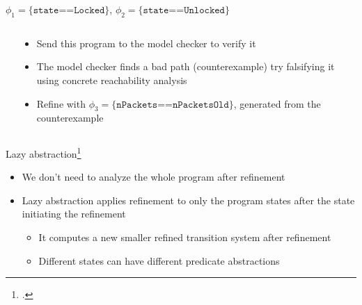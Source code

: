 \documentclass[aspectratio=169,notes]{beamer}
\begin{document}
\begin{frame}{}
  \begingroup\footnotesize\vspace{-0.7em}
  $\phi_1 = \texttt{\{state==Locked\}}$, $\phi_2 = \texttt{\{state==Unlocked\}}$\vspace{-1.7em}
  \begin{columns}[t]
    \begin{column}{0.50\textwidth}
      
    \end{column}\pause
    \begin{column}{0.50\textwidth}
      \begin{center}

        \begin{itemize}\footnotesize
        \item<5-> Send this program to the model checker to verify it
        \item<6-> The model checker finds a bad path (counterexample) try falsifying it using concrete reachability analysis%
        \item<7-> Refine with $\phi_3 = \texttt{\{nPackets==nPacketsOld\}}$, generated from the counterexample
        \end{itemize}
      \end{center}

    \end{column}
  \end{columns}
  \endgroup

\end{frame}

\begin{frame}{Lazy abstraction\footcite{henzinger2002lazy}}
  \begin{itemize}[<+->]
  \item We don't need to analyze the whole program after refinement
  \item Lazy abstraction applies refinement to only the program states after the state initiating the refinement
    \begin{itemize}
    \item It computes a new smaller refined transition system after refinement
    \item Different states can have different predicate abstractions
    \end{itemize}
  \end{itemize}
\end{frame}
\end{document}
